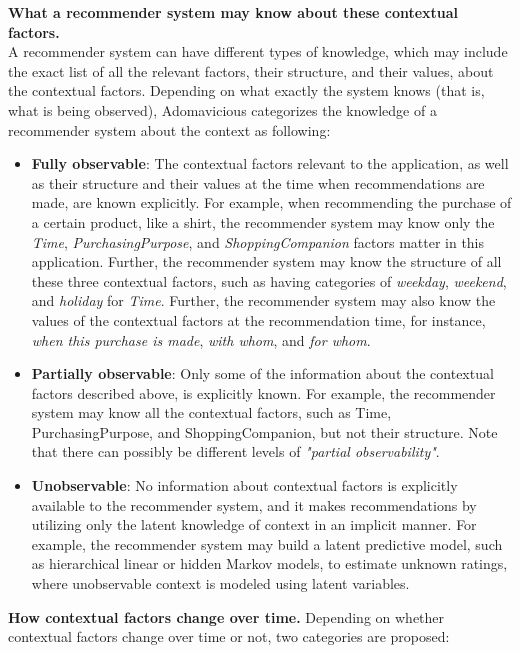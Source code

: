 \textbf{What a recommender system may know about these contextual factors.}\\
A recommender system can have different types of knowledge, which may include 
the exact list of all the relevant factors, their structure, and their values, 
about the contextual factors. Depending on what exactly the system knows (that 
is, what is being observed), Adomavicious categorizes the knowledge of a 
recommender system about the context as following: 
	\begin{itemize}
	\item \textbf{Fully observable}: The contextual factors relevant to the 
	application, as well as their structure and their values at the time when 
	recommendations are made, are known explicitly. For example, when
	recommending the purchase of a certain product, like a shirt, the 
	recommender system may know only the \textit{Time}, \textit{PurchasingPurpose}, 
	and \textit{ShoppingCompanion} factors matter in this application. Further, 
	the recommender system may know the structure of all these three contextual 
	factors, such as having categories of \textit{weekday}, \textit{weekend}, 
	and \textit{holiday} for \textit{Time}. Further, the recommender system 
	may also know the values of the contextual factors at the recommendation 
	time, for instance, \textit{when this purchase is made}, 
	\textit{with whom}, and \textit{for whom}.
	\item \textbf{Partially observable}: Only some of the information about 
	the contextual factors described above, is explicitly known. For example, 
	the recommender system may know all the contextual factors, such as Time, 
	PurchasingPurpose, and ShoppingCompanion, but not their structure. Note that 
	there can possibly be different levels of \textit{"partial observability"}. 
	\item \textbf{Unobservable}: No information about contextual factors is 
	explicitly available to the recommender system, and it makes recommendations 
	by utilizing only the latent knowledge of context in an implicit manner. 
	For example, the recommender system may build a latent predictive model, 
	such as hierarchical linear or hidden Markov models, to estimate unknown 
	ratings, where unobservable context is modeled using latent variables.
	\end{itemize}
\textbf{How contextual factors change over time.} Depending on whether 
contextual factors change over time or not, two categories are proposed: 
